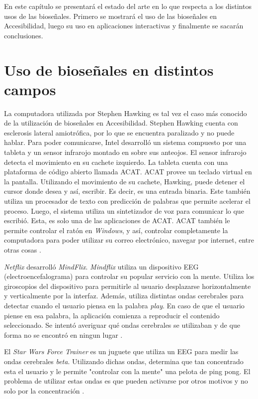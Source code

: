 En este capítulo se presentará el estado del arte en lo que respecta a los distintos usos de las bioseñales. Primero se mostrará el uso de las bioseñales en Accesibilidad, luego su uso en aplicaciones interactivas y finalmente se sacarán conclusiones. 

\section{Uso de bioseñales en distintos campos}

La computadora utilizada por Stephen Hawking es tal vez el caso más conocido de la utilización de bioseñales en Accesibilidad. Stephen Hawking cuenta con esclerosis lateral amiotrófica, por lo que se encuentra paralizado y no puede hablar. Para poder comunicarse, Intel desarrolló un sistema compuesto por una tableta y un sensor infrarojo montado en sobre sus anteojos. El sensor infrarojo detecta el movimiento en su cachete izquierdo. La tableta cuenta con una plataforma de código abierto llamada ACAT. ACAT provee un teclado virtual en la pantalla. Utilizando el movimiento de su cachete, Hawking, puede detener el cursor donde desea y así, escribir. Es decir, es una entrada binaria. Este también utiliza un procesador de texto con predicción de palabras que permite acelerar el proceso.  Luego, el sistema utiliza un sintetizador de voz para comunicar lo que escribió. Esta, es solo una de las aplicaciones de ACAT. ACAT también le permite controlar el ratón en \emph{Windows}, y así, controlar completamente la computadora para poder utilizar su correo electrónico, navegar por internet, entre otras cosas \cite{hawking}.


\emph{Netflix} desarrolló \emph{MindFlix}. \emph{Mindflix} utiliza un dispositivo EEG (electroencefalograma) para controlar su popular servicio con la mente. Utiliza los giroscopios del dispositivo para permitirle al usuario desplazarse horizontalmente y verticalmente por la interfaz. Además, utiliza distintas ondas cerebrales para detectar cuando el usuario piensa en la palabra \emph{play}. En caso de que el usuario piense en esa palabra,  la aplicación comienza a reproducir el contenido seleccionado. Se intentó averiguar qué ondas cerebrales se utilizaban y de que forma no se encontró en ningun lugar \cite{mindflix}.

El \emph{Star Wars Force Trainer} es un juguete que utiliza un EEG para medir las ondas cerebrales \emph{beta}. Utilizando dichas ondas, determina que tan concentrado esta el usuario y le permite "controlar con la mente" una pelota de ping pong. El problema de utilizar estas ondas es que pueden activarse por otros motivos y no solo por la concentración \cite{force}.


